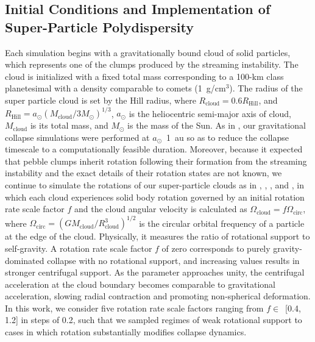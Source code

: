 \documentclass[fleqn,usenatbib]{mnras}
\begin{document}
\subsection{Initial Conditions and Implementation of Super-Particle Polydispersity}\label{sec:simulations}
Each simulation begins with a gravitationally bound cloud of solid particles, which represents one of the clumps produced by the streaming instability. 
The cloud is initialized with a fixed total mass corresponding to a 100-km class planetesimal with a density comparable to comets (1~g/cm$^3$).
The radius of the super particle cloud is set by the Hill radius, where $R_{\text{cloud}} = 0.6 R_{\text{Hill}}$, and $R_{\text{Hill}} = a_{\odot} (M_{\text{cloud}}/ 3 M_{\odot})^{1/3}$, $a_{\odot}$ is the heliocentric semi-major axis of cloud, $M_{\text{cloud}}$ is its total mass, and $M_{\odot}$ is the mass of the Sun.
As in \citet{Barnes2025}, our gravitational collapse simulations were performed at $a_{\odot}$~1~au so as to reduce the collapse timescale to a computationally feasible duration.
Moreover, because it expected that pebble clumps inherit rotation following their formation from the streaming instability \citep{Johansen2007b,Nesvorny2019} and the exact details of their rotation states are not known, we continue to simulate the rotations of our super-particle clouds as in \citet{Nesvorny2010}, \citet{Nesvorny2021}, \citet{Robinson2020}, and \citet{Barnes2025}, in which each cloud experiences solid body rotation governed by an initial rotation rate scale factor $f$ and the cloud angular velocity is calculated as $\Omega_{\text{cloud}} = f\Omega_{\text{circ}}$, where $\Omega_{\text{circ}} = (GM_{\text{cloud}}/R^3_{\text{cloud}})^{1/2}$ is the circular orbital frequency of a particle at the edge of the cloud.
Physically, it measures the ratio of rotational support to self-gravity. 
A rotation rate scale factor $f$ of zero corresponds to purely gravity-dominated collapse with no rotational support, and increasing values results in stronger centrifugal support.
As the parameter approaches unity, the centrifugal acceleration at the cloud boundary becomes comparable to gravitational acceleration, slowing radial contraction and promoting non-spherical deformation.
In this work, we consider five rotation rate scale factors ranging from $f\in$~[0.4, 1.2] in steps of 0.2, such that we sampled regimes of weak rotational support to cases in which rotation substantially modifies collapse dynamics.
\end{document}
